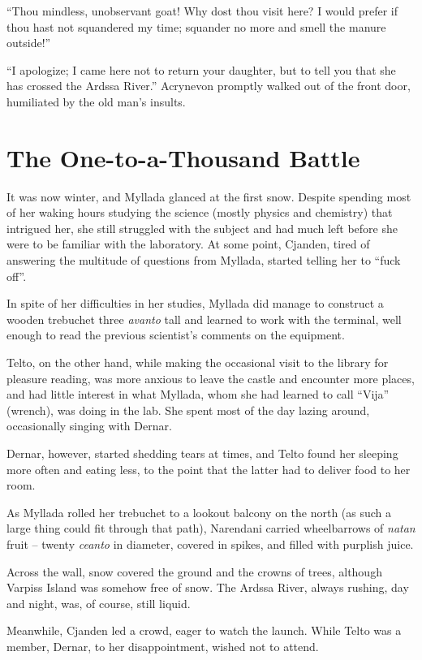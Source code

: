 ``Thou mindless, unobservant goat! Why dost thou visit here? I would prefer if thou hast not squandered my time; squander no more and smell the manure outside!''

``I apologize; I came here not to return your daughter, but to tell you that she has crossed the Ardssa River.'' Acrynevon promptly walked out of the front door, humiliated by the old man's insults.

\chapter{The One-to-a-Thousand Battle}

It was now winter, and Myllada glanced at the first snow. Despite spending most of her waking hours studying the science (mostly physics and chemistry) that intrigued her, she still struggled with the subject and had much left before she were to be familiar with the laboratory. At some point, Cjanden, tired of answering the multitude of questions from Myllada, started telling her to ``fuck off''.

In spite of her difficulties in her studies, Myllada did manage to construct a wooden trebuchet three \emph{avanto} tall and learned to work with the terminal, well enough to read the previous scientist's comments on the equipment.

Telto, on the other hand, while making the occasional visit to the library for pleasure reading, was more anxious to leave the castle and encounter more places, and had little interest in what Myllada, whom she had learned to call ``Vija'' (wrench), was doing in the lab. She spent most of the day lazing around, occasionally singing with Dernar.

Dernar, however, started shedding tears at times, and Telto found her sleeping more often and eating less, to the point that the latter had to deliver food to her room.

\centeredstars

As Myllada rolled her trebuchet to a lookout balcony on the north (as such a large thing could fit through that path), Narendani carried wheelbarrows of \emph{natan} fruit -- twenty \emph{ceanto} in diameter, covered in spikes, and filled with purplish juice.

Across the wall, snow covered the ground and the crowns of trees, although Varpiss Island was somehow free of snow. The Ardssa River, always rushing, day and night, was, of course, still liquid.

Meanwhile, Cjanden led a crowd, eager to watch the launch. While Telto was a member, Dernar, to her disappointment, wished not to attend.

